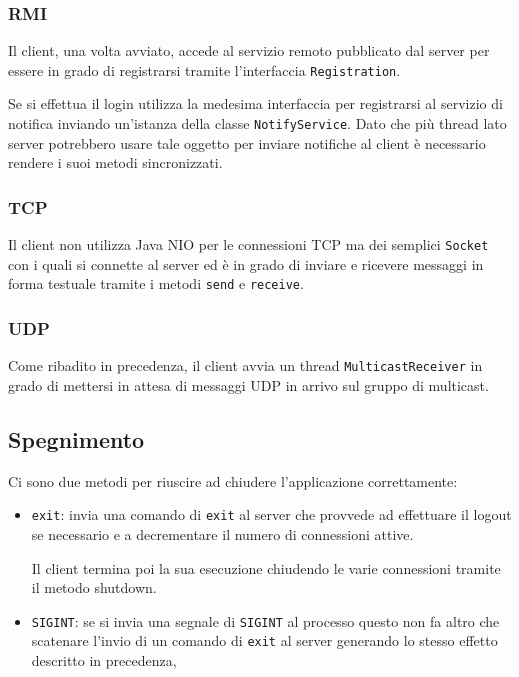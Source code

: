 \subsubsection{RMI}
Il client, una volta avviato, accede al servizio remoto pubblicato dal server per essere in grado
di registrarsi tramite l'interfaccia \verb|Registration|.

Se si effettua il login utilizza la medesima interfaccia per registrarsi al servizio di notifica
inviando un'istanza della classe \verb|NotifyService|. Dato che più thread lato server potrebbero
usare tale oggetto per inviare notifiche al client è necessario rendere i suoi metodi
sincronizzati.

\subsubsection{TCP}
Il client non utilizza Java NIO per le connessioni TCP ma dei semplici \verb|Socket| con i quali
si connette al server ed è in grado di inviare e ricevere messaggi in forma testuale tramite i
metodi \verb|send| e \verb|receive|.

\subsubsection{UDP}
Come ribadito in precedenza, il client avvia un thread \verb|MulticastReceiver| in grado di
mettersi in attesa di messaggi UDP in arrivo sul gruppo di multicast.

\subsection{Spegnimento}
Ci sono due metodi per riuscire ad chiudere l'applicazione correttamente:
\begin{itemize}
	\item \verb|exit|: invia una comando di \verb|exit| al server che provvede ad effettuare il
	      logout se necessario e a decrementare il numero di connessioni attive.

	      Il client termina poi la sua esecuzione chiudendo le varie connessioni tramite il metodo
	      shutdown.
	\item \verb|SIGINT|: se si invia una segnale di \verb|SIGINT| al processo questo non fa altro
	      che scatenare l'invio di un comando di \verb|exit| al server generando lo stesso effetto
	      descritto in precedenza,
\end{itemize}
